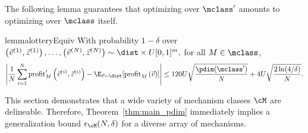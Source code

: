 The following lemma guarantees that optimizing over $\mclass'$ amounts to optimizing over $\mclass$ itself.

\begin{restatable}{lemma}{lotteryEquiv} \label{lem:lottery_equiv}
With probability $1-\delta$ over $\left(\vec{v}^{\left(1\right)}, \vec{z}^{\left(1\right)}\right), \dots, \left(\vec{v}^{\left(N\right)}, \vec{z}^{\left(N\right)}\right) \sim \dist \times U[0,1]^{m},$ for all $M \in \mclass$, \[\left|\frac{1}{N} \sum_{i = 1}^N \profit_{M} '\left(\vec{v}^{\left(i\right)}, \vec{z}^{\left(i\right)}\right) - \E_{\vec{v} \sim \dist}[\profit_M\left(\vec{v}\right)] \right| \leq 120U\sqrt{\frac{\pdim(\mclass')}{N}} + 4U \sqrt{\frac{2\ln(4/\delta)}{N}}.\]
\end{restatable}

This section demonstrates that a wide variety of mechanism classes $\cM$ are delineable. Therefore, Theorem~\ref{thm:main_pdim} immediately implies a generalization bound $\epsilon_{\cM}(N, \delta)$ for a diverse array of mechanisms.